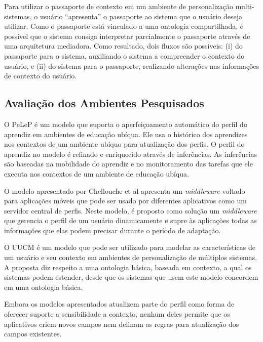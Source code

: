 Para utilizar o passaporte de contexto em um ambiente de personalização multi-sistemas, o usuário ``apresenta'' o passaporte ao sistema que o usuário deseja utilizar. Como o passaporte está vinculado a uma ontologia compartilhada, é possível que o sistema consiga interpretar parcialmente o passaporte através de uma arquitetura mediadora. Como resultado, dois fluxos são possíveis: (i) do passaporte para o sistema, auxiliando o sistema a compreender o contexto do usuário, e (ii) do sistema para o passaporte, realizando alterações nas informações de contexto do usuário.


\subsection{Avaliação dos Ambientes Pesquisados}

O PeLeP\cite{pelep} é um modelo que suporta o aperfeiçoamento automático do perfil do aprendiz em ambientes de educação ubíqua. Ele usa o histórico dos aprendizes nos contextos de um ambiente ubíquo para atualização dos perfis. O perfil do aprendiz no modelo é refinado e enriquecido através de inferências. As inferências são baseadas na mobilidade do aprendiz e no monitoramento das tarefas que ele executa nos contextos de um ambiente de educação ubíqua.

O modelo apresentado por Chellouche et al\cite{chellouche10} apresenta um \emph{middleware} voltado para aplicações móveis que pode ser usado por diferentes aplicativos como um servidor central de perfis. Neste modelo, é proposto como solução um \emph{middleware} que gerencia o perfil de um usuário dinamicamente e supre às aplicações todas as informações que elas podem precisar durante o período de adaptação.

O UUCM\cite{niederee04} é um modelo que pode ser utilizado para modelar as características de um usuário e seu contexto em ambientes de personalização de múltiplos sistemas. A proposta diz respeito a uma ontologia básica, baseada em contexto, a qual os sistemas podem estender, desde que os sistemas que usem este modelo concordem em uma ontologia básica.

Embora os modelos apresentados atualizem parte do perfil como forma de oferecer suporte a sensibilidade a contexto, nenhum deles permite que os aplicativos criem novos campos nem definam as regras para atualização dos campos existentes.

